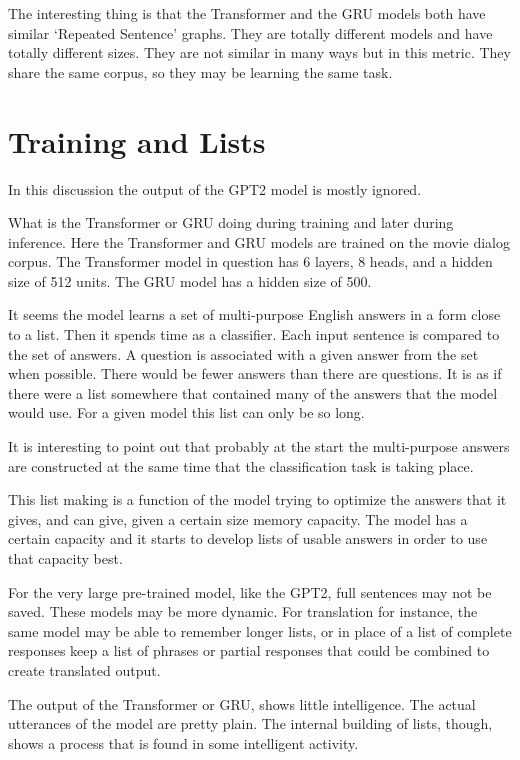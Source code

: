 The interesting thing is that the Transformer and the GRU models both have similar `Repeated Sentence' graphs. They are totally different models and have totally different sizes. They are not similar in many ways but in this metric. They share the same corpus, so they may be learning the same task.

\section{Training and Lists}
In this discussion the output of the GPT2 model is mostly ignored. %

What is the Transformer or GRU doing during training and later during inference. Here the Transformer and GRU models are trained on the movie dialog corpus. The Transformer model in question has 6 layers, 8 heads, and a hidden size of 512 units. The GRU model has a hidden size of 500.

It seems the model learns a set of multi-purpose English answers in a form close to a list. Then it spends time as a classifier. Each input sentence is compared to the set of answers. A question is associated with a given answer from the set when possible. There would be fewer answers than there are questions. It is as if there were a list somewhere that contained many of the answers that the model would use. For a given model this list can only be so long.

It is interesting to point out that probably at the start the multi-purpose answers are constructed at the same time that the classification task is taking place. 

This list making is a function of the model trying to optimize the answers that it gives, and can give, given a certain size memory capacity. The model has a certain capacity and it starts to develop lists of usable answers in order to use that capacity best.

For the very large pre-trained model, like the GPT2, full sentences may not be saved. These models may be more dynamic. For translation for instance, the same model may be able to remember longer lists, or in place of a list of complete responses keep a list of phrases or partial responses that could be combined to create translated output.

The output of the Transformer or GRU, shows little intelligence. The actual utterances of the model are pretty plain. The internal building of lists, though, shows a process that is found in some intelligent activity.